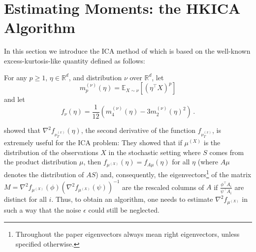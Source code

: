 \documentclass[jmlr]{article}
\newcommand{\E}{\mathbb{E}}
\newcommand{\real}{\mathbb{R}}
\newcommand{\R}{\real}
\theoremstyle{definition}
\begin{document}
\section{Estimating Moments: the HKICA Algorithm}
\label{sec:HKICA}
In this section we introduce the ICA method of \citet{hsu2013learning} which is based on the well-known excess-kurtosis-like quantity
defined as follows:

For any $p\ge 1$, $\eta\in \real^d$, and distribution $\nu$ over $\R^d$,
let 
\begin{equation}
\label{eq:momnent}
m_p^{(\nu)}(\eta) = \E_{X\sim \nu}[ (\eta^\top X)^p ]
\end{equation}
and let
\begin{equation}
\label{eq:funcf}
f_{\nu}(\eta) = \frac1{12} \left( m_4^{(\nu)}(\eta) - 3 m_2^{(\nu)}(\eta)^2 \right)\,.
\end{equation}

\citet{hsu2013learning} showed that $\nabla^2f_{\nu_T^{(x)}}(\eta)$, the second derivative of the function $f_{\nu_T^{(x)}}$, is extremely useful for the ICA problem:
They showed that if $\mu^{(X)}$ is the distribution of the observations $X$ in the stochastic setting where $S$ comes from the product distribution $\mu$, then
$f_{\mu^{(X)}}(\eta)=f_{A\mu}(\eta)$ for all $\eta$ (where $A\mu$ denotes the distribution of $AS$) and, consequently, the eigenvectors\footnote{Throughout the paper eigenvectors always mean right eigenvectors, unless specified otherwise.} of the matrix $M=\nabla^2f_{\mu^{(X)}}(\phi)(\nabla^2f_{\mu^{(X)}}(\psi))^{-1}$ are the rescaled columns of $A$ if $\frac{\phi^\top A_i}{\psi^\top A_i}$ are distinct for all $i$. Thus, to obtain an algorithm, one needs to estimate $\nabla^2 f_{\mu^{(X)}}$ in such a way that the noise $\epsilon$ could still be neglected.
\end{document}
